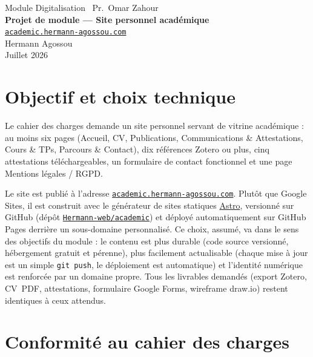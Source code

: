 \documentclass[11pt,a4paper]{article}
\newcommand{\siteurl}{\href{https://academic.hermann-agossou.com}{\texttt{academic.hermann-agossou.com}}}
\begin{document}
\begin{center}
  {\color{soft}Module Digitalisation \textbullet\ Pr.\ Omar Zahour}\\[1.2em]
  {\color{primary}\bfseries\LARGE Projet de module — Site personnel académique}\\[0.5em]
  {\color{soft}\large \siteurl}\\[1.2em]
  Hermann Agossou\\[0.3em]
  {\color{soft}\small Juillet 2026}
\end{center}

\vspace{0.8em}

\section{Objectif et choix technique}

Le cahier des charges demande un site personnel servant de vitrine académique :
au moins six pages (Accueil, CV, Publications, Communications \& Attestations,
Cours \& TPs, Parcours \& Contact), dix références Zotero ou plus, cinq
attestations téléchargeables, un formulaire de contact fonctionnel et une page
Mentions légales / RGPD.

Le site est publié à l'adresse \siteurl. Plutôt que Google Sites, il est
construit avec le générateur de sites statiques
\href{https://astro.build}{Astro}, versionné sur GitHub (dépôt
\href{https://github.com/Hermann-web/academic}{\texttt{Hermann-web/academic}})
et déployé automatiquement sur GitHub Pages derrière un sous-domaine
personnalisé. Ce choix, assumé, va dans le sens des objectifs du module : le
contenu est plus durable (code source versionné, hébergement gratuit et
pérenne), plus facilement actualisable (chaque mise à jour est un simple
\texttt{git push}, le déploiement est automatique) et l'identité numérique est
renforcée par un domaine propre. Tous les livrables demandés (export Zotero,
CV~PDF, attestations, formulaire Google Forms, wireframe draw.io) restent
identiques à ceux attendus.

\section{Conformité au cahier des charges}
\end{document}
